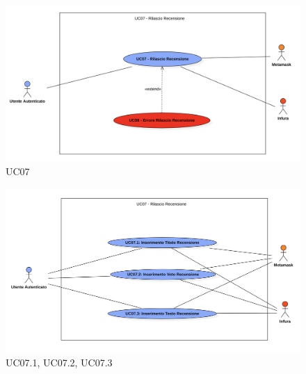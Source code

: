             \begin{figure}[H]
                \centering
                \includegraphics[scale=0.4]{src/img/UC07.png}
                \caption{UC07}
            \end{figure}

            \begin{figure}[H]
                \centering
                \includegraphics[scale=0.4]{src/img/UC07.X.png}
                \caption{UC07.1, UC07.2, UC07.3}
            \end{figure}

